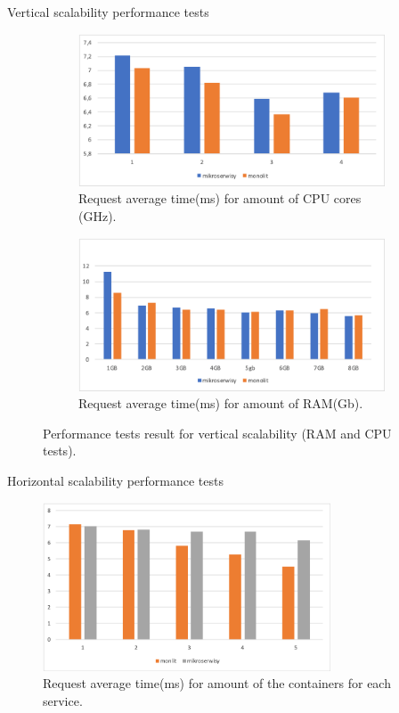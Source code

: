 \documentclass{beamer}
\begin{document}
	
	\begin{frame}{Vertical scalability performance tests}
		\begin{figure}[h!]
  			\centering
  			\begin{subfigure}[b]{0.45\linewidth}
    			\includegraphics[width=\linewidth]{pictures/cputest}
    			\caption{Request average time(ms) for amount of CPU cores (GHz).}
  			\end{subfigure}
  			\begin{subfigure}[b]{0.45\linewidth}
    			\includegraphics[width=\linewidth]{pictures/ramtest}
    			\caption{Request average time(ms) for amount of RAM(Gb).}
  			\end{subfigure}
  				\caption{Performance tests result for vertical scalability (RAM and CPU tests).}
  				\label{fig:coffee}
		\end{figure}
	\end{frame}
	
	\begin{frame}{Horizontal scalability performance tests}
		\begin{figure}[h!]
			\centering
			\includegraphics[height=5cm]{Pictures/kontenery}
			\caption{Request average time(ms) for amount of the containers for each service.}	
			\label{fig:architekturaTroj}
		\end{figure}
	\end{frame}
	
\end{document}
